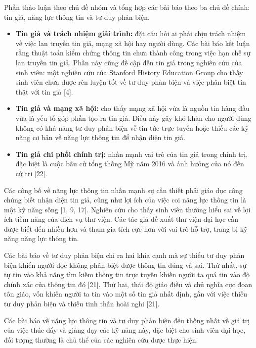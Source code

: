 Phần thảo luận theo chủ đề nhóm và tổng hợp các bài báo theo ba chủ đề chính: tin giả, năng lực thông tin và tư duy phản biện.

\begin{itemize}
\item
  \textbf{Tin giả và trách nhiệm giải trình:} đặt câu hỏi ai phải chịu trách nhiệm về việc lan truyền tin giả, mạng xã hội hay người dùng. Các bài báo kết luận rằng thuật toán kiểm chứng thông tin chưa thành công trong việc hạn chế sự lan truyền tin giả. Phần này cũng đề cập đến tin giả trong nghiên cứu của sinh viên: một nghiên cứu của Stanford History Education Group cho thấy sinh viên chưa được rèn luyện tốt về tư duy phản biện và việc phân biệt tin thật với tin giả {[}4{]}.
\item
  \textbf{Tin giả và mạng xã hội:} cho thấy mạng xã hội vừa là nguồn tin hàng đầu vừa là yếu tố góp phần tạo ra tin giả. Điều này gây khó khăn cho người dùng không có khả năng tư duy phản biện về tin tức trực tuyến hoặc thiếu các kỹ năng cơ bản về năng lực thông tin để nhận diện tin giả.
\item
  \textbf{Tin giả chi phối chính trị:} nhấn mạnh vai trò của tin giả trong chính trị, đặc biệt là cuộc bầu cử tổng thống Mỹ năm 2016 và ảnh hưởng của nó đến cử tri {[}22{]}.
\end{itemize}

Các công bố về năng lực thông tin nhấn mạnh sự cần thiết phải giáo dục công chúng biết nhận diện tin giả, cũng như lợi ích của việc coi năng lực thông tin là một kỹ năng sống {[}1, 9, 17{]}. Nghiên cứu cho thấy sinh viên thường hiểu sai về lợi ích tiềm năng của dịch vụ thư viện. Các tác giả đề xuất thư viện đại học cần được biết đến nhiều hơn và tham gia tích cực hơn với vai trò hỗ trợ, trang bị kỹ năng năng lực thông tin.

Các bài báo về tư duy phản biện chỉ ra hai khía cạnh mà sự thiếu tư duy phản biện khiến người đọc không phân biệt được thông tin đúng và sai. Thứ nhất, sự tự tin vào khả năng tìm kiếm thông tin trực tuyến khiến người ta quá tin vào độ chính xác của thông tin đó {[}21{]}. Thứ hai, thái độ giáo điều và chủ nghĩa cực đoan tôn giáo, vốn khiến người ta tin vào một số tin giả nhất định, gắn với việc thiếu tư duy phản biện và thiếu tinh thần hoài nghi {[}21{]}.

Các bài báo về năng lực thông tin và tư duy phản biện đều thống nhất về giá trị của việc thúc đẩy và giảng dạy các kỹ năng này, đặc biệt cho sinh viên đại học, đối tượng thường là chủ thể của các nghiên cứu được thực hiện.

